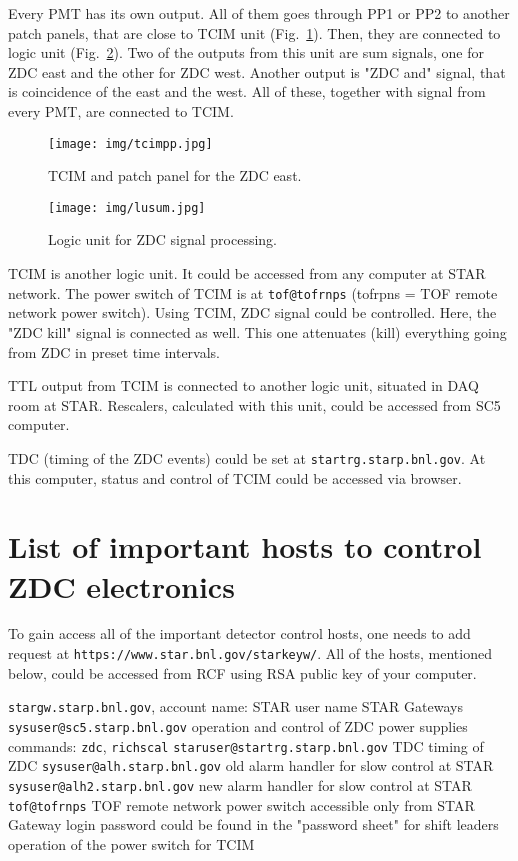Every PMT has its own output. All of them goes through PP1 or PP2 to another patch panels, that are close to TCIM unit (Fig.~\ref{tcimpp}). Then, they are connected to logic unit (Fig.~\ref{lu_sum}).  Two of the outputs from this unit are sum signals, one for ZDC east and the other for ZDC west. Another output is "ZDC and" signal, that is coincidence of the east and the west. All of these, together with signal from every PMT, are connected to TCIM.

\begin{figure}[htb]
\begin{center}
\texttt{[image: img/tcimpp.jpg]}
\end{center}
\caption{TCIM and patch panel for the ZDC east.}
\label{tcimpp}
\end{figure}


\begin{figure}[htb]
\begin{center}
\texttt{[image: img/lusum.jpg]}
\end{center}
\caption{Logic unit for ZDC signal processing.}
\label{lu_sum}
\end{figure}

TCIM is another logic unit.  It could be accessed from any  computer at STAR network.
The power switch of TCIM is at \texttt{tof@tofrnps} (tofrpns = TOF remote network power switch).
Using TCIM, ZDC signal could be controlled. Here, the "ZDC kill" signal is connected as well. This one attenuates (kill) everything going from ZDC in preset time intervals.

TTL output from TCIM is connected to another logic unit, situated in DAQ room at STAR. Rescalers, calculated with this unit, could be accessed from SC5 computer.

TDC (timing of the ZDC events) could be set at \texttt{startrg.starp.bnl.gov}. At this computer, status and control of TCIM could be accessed via browser.

\section{List of important hosts to control ZDC electronics}

To gain access all of the important detector control hosts, one needs to add request at \texttt{https://www.star.bnl.gov/starkeyw/}. All of the hosts, mentioned below, could be accessed from RCF using RSA public key of your computer.
\begin{outline}
 \1 \texttt{stargw.starp.bnl.gov}, account name: STAR user name
  \2 STAR Gateways
 \1 \texttt{sysuser@sc5.starp.bnl.gov} 
  \2 operation and control of ZDC power supplies
  \2 commands: \texttt{zdc}, \texttt{richscal}
 \1 \texttt{staruser@startrg.starp.bnl.gov}
   \2 TDC timing of ZDC
 \1 \texttt{sysuser@alh.starp.bnl.gov} 
   \2 old alarm handler for slow control at STAR
 \1 \texttt{sysuser@alh2.starp.bnl.gov}
   \2 new alarm handler for slow control at STAR
 \1 \texttt{tof@tofrnps}
   \2 TOF remote network power switch
   \2 accessible only from STAR Gateway
   \2 login password could be found in the "password sheet" for shift leaders
   \2 operation of the power switch for TCIM
\end{outline}
 
